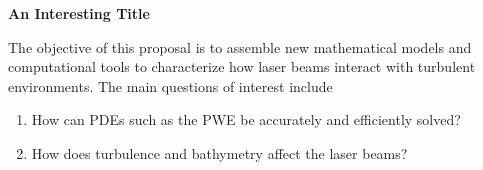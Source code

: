 \documentclass[11pt]{article}
\begin{document}
\begin{center}
  {\bf An Interesting Title}
\end{center}

The objective of this proposal is to assemble new mathematical models
and computational tools to characterize how laser beams interact with
turbulent environments. The main questions of interest include
\begin{enumerate}
  \item How can PDEs such as the PWE be accurately and efficiently
    solved?

  \item How does turbulence and bathymetry affect the laser beams?

\end{enumerate}
\end{document}
